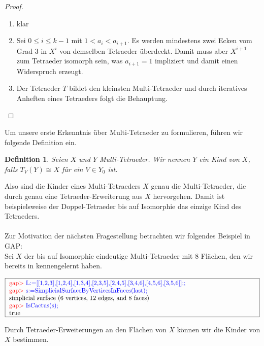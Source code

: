\documentclass[12pt,titlepage,twoside,cleardoublepage]{article}
\theoremstyle{nummermitklammern}
\newtheorem{definition}[temp]{Definition}
\newtheorem{definition}[zahl]{Definition}
\numberwithin{equation}{section}
\begin{document}
\begin{proof}
\begin{enumerate}
\item klar
\item Sei $0\leq i \leq k-1$ mit $1<a_i <a_{i+1}.$ Es werden mindestens zwei Ecken vom Grad 3 in $X^{i}$ von demselben Tetraeder überdeckt. Damit muss aber $X^{i+1}$ zum Tetraeder isomorph sein, was $a_{i+1}=1$ impliziert und damit einen Widerspruch erzeugt.
 \item Der Tetraeder $T$ bildet den kleinsten Multi-Tetraeder  und durch iteratives Anheften eines Tetraeders folgt die Behauptung.
\end{enumerate}
\end{proof}

Um unsere erste Erkenntnis über Multi-Tetraeder zu formulieren, führen wir folgende Definition ein.
\begin{definition}
Seien $X$ und $Y$ Multi-Tetraeder. Wir nennen $Y$ ein Kind von $X$, falls $T_V(Y)\cong X$ für ein $V\in Y_0$ ist.
\end{definition}
Also sind die Kinder eines Multi-Tetraeders $X$ genau die Multi-Tetraeder, die durch genau eine Tetraeder-Erweiterung aus $X$ hervorgehen.
Damit ist beispielsweise der Doppel-Tetraeder bis auf Isomorphie das einzige Kind des Tetraeders. \\\\
Zur Motivation der nächsten Fragestellung betrachten wir folgendes Beispiel in GAP:\\
Sei $X$ der bis auf Isomorphie eindeutige Multi-Tetraeder mit 8 Flächen, den wir bereits in  kennengelernt haben. 
\begin{center}
$\fbox{
\parbox{14cm}{
\textcolor{red}{gap$>$} \textcolor{blue}{L:=[[1,2,3],[1,2,4],[1,3,4],[2,3,5],[2,4,5],[3,4,6],[4,5,6],[3,5,6]];;}\newline
\textcolor{red}{gap$>$} \textcolor{blue}{s:=SimplicialSurfaceByVerticesInFaces(last);}\newline
simplicial surface (6 vertices, 12 edges, and 8 faces)\newline
\textcolor{red}{gap$>$} \textcolor{blue}{IsCactus(s);}\newline
true
}}$
\end{center}
Durch Tetraeder-Erweiterungen an den Flächen von $X$ können wir die Kinder von $X$ bestimmen.
\end{document}
